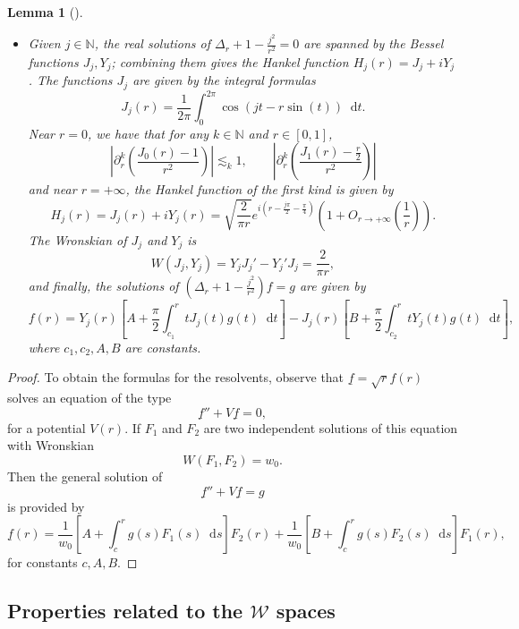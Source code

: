 \documentclass[11 pt]{amsart}
\newtheorem{lem}{Lemma}[section]
\theoremstyle{definition}
\theoremstyle{remark}
\numberwithin{equation}{section}
\newcommand{\dd}{\mathop{}\!\mathrm{d}}
\begin{document}
\begin{lem}[\cite{olver2010nist}]
\begin{itemize}
\item[b)] Given $j \in \mathbb{N}$, the real solutions of $\Delta_r + 1 - \frac{j^2}{r^2}
= 0$ are spanned by the Bessel functions $J_j, Y_j$; combining them gives the Hankel function $ H_j (r) = J_j+ i Y_j$. The functions $J_j$ are
given by the integral formulas
\begin{equation}
J_j (r) = \frac{1}{2 \pi} \int_0^{2 \pi} \cos (jt - r \sin (t)) \dd t
  \label{formulaintJ0}.
\end{equation}
Near $r = 0$, we have that for any $k \in \mathbb{N}$ and $r \in [0, 1]$,
\[ \left| \partial_r^k \left( \frac{J_0 (r) - 1}{r^2} \right) \right|
   \lesssim_k 1, \qquad \left| \partial_r^k \left( \frac{J_1 (r) - \frac{r}{2}}{r^2} \right) \right| \]
and near $r = + \infty$, the Hankel function of the first kind is given by
\[ H_j (r) = J_j (r) + i Y_j (r) = \sqrt{\frac{2}{\pi r}} e^{i \left( r
   - \frac{j \pi}{2} - \frac{\pi}{4} \right)} \left( 1 + O_{r \rightarrow +
   \infty} \left( \frac{1}{r} \right) \right) . \]
The Wronskian of $J_j$ and $Y_j$ is
\[ W (J_j, Y_j) = Y_j J_j' - Y_j' J_j = \frac{2}{\pi r}, \]
and finally, the solutions of $\left( \Delta_r + 1 - \frac{j^2}{r^2} \right) f
= g$ are given by
\[ f (r) = Y_j (r) \left[ A + \frac{\pi}{2} \int_{c_1}^r t J_j (t) g (t)\dd t
   \right] - J_j (r) \left[ B + \frac{\pi}{2} \int_{c_2}^r t Y_j (t) g (t)\dd t
   \right] , \]
  where $c_1, c_2,A,B$ are constants.

\end{itemize}
\end{lem}

\begin{proof}
To obtain the formulas for the resolvents, observe that $\underline{f} =\sqrt{r} f(r)$ solves an equation of the type
$$
\underline{f}'' + V \underline{f} = 0,
$$
for a potential $V(r)$. If $F_1$ and $F_2$ are two independent solutions of this equation with Wronskian
$$
W(F_1,F_2) = w_0.
$$
Then the general solution of 
$$
\underline{f}'' + V \underline{f} = g
$$
is provided by
$$
\underline{f} (r) = \frac{1}{w_0} \left[A + \int_c^r g(s) F_1(s) \dd s \right] F_2(r) + \frac{1}{w_0} \left[B + \int_c^r g(s) F_2(s) \dd s \right] F_1(r),
$$
for constants $c,A,B$.
\end{proof}


\subsection{Properties related to the $\mathcal{W}$ spaces}
\end{document}
